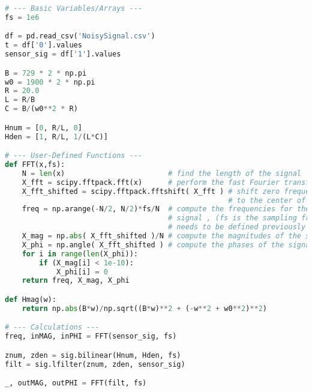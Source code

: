 \documentclass[12pt]{report}
\begin{document}
\begin{lstlisting}[language=Python]
# --- Basic Variables/Arrays ---
fs = 1e6

df = pd.read_csv('NoisySignal.csv')
t = df['0'].values
sensor_sig = df['1'].values

B = 729 * 2 * np.pi
w0 = 1900 * 2 * np.pi
R = 20.0
L = R/B
C = B/(w0**2 * R)

Hnum = [0, R/L, 0]
Hden = [1, R/L, 1/(L*C)]

# --- User-Defined Functions ---
def FFT(x,fs):
    N = len(x)                        # find the length of the signal
    X_fft = scipy.fftpack.fft(x)      # perform the fast Fourier transform (fft)
    X_fft_shifted = scipy.fftpack.fftshift( X_fft ) # shift zero frequency components
                                                    # to the center of the spectrum             
    freq = np.arange(-N/2, N/2)*fs/N  # compute the frequencies for the output
                                      # signal , (fs is the sampling frequency and
                                      # needs to be defined previously in your code
    X_mag = np.abs( X_fft_shifted )/N # compute the magnitudes of the signal
    X_phi = np.angle( X_fft_shifted ) # compute the phases of the signal
    for i in range(len(X_phi)):
        if (X_mag[i] < 1e-10):
            X_phi[i] = 0
    return freq, X_mag, X_phi

def Hmag(w):
    return np.abs(B*w)/np.sqrt((B*w)**2 + (-w**2 + w0**2)**2)

# --- Calculations ---
freq, inMAG, inPHI = FFT(sensor_sig, fs)

znum, zden = sig.bilinear(Hnum, Hden, fs)
filt = sig.lfilter(znum, zden, sensor_sig)

_, outMAG, outPHI = FFT(filt, fs)

\end{lstlisting}
\end{document}
